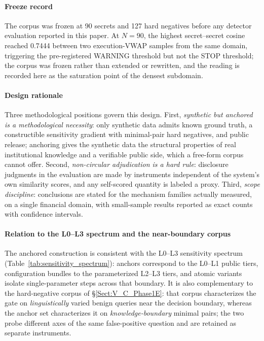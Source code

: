 \documentclass[journal]{IEEEtran}
\begin{document}
\paragraph{Freeze record}
The corpus was frozen at 90 secrets and 127 hard negatives before any
detector evaluation reported in this paper. At $N{=}90$, the highest
secret--secret cosine reached 0.7444 between two execution-VWAP samples from
the same domain, triggering the pre-registered WARNING threshold but not the
STOP threshold; the corpus was frozen rather than extended or rewritten, and
the reading is recorded here as the saturation point of the densest
subdomain.

\paragraph{Design rationale}
Three methodological positions govern this design. First, \emph{synthetic but
anchored is a methodological necessity}: only synthetic data admits known
ground truth, a constructible sensitivity gradient with minimal-pair hard
negatives, and public release; anchoring gives the synthetic data the
structural properties of real institutional knowledge and a verifiable public
side, which a free-form corpus cannot offer. Second, \emph{non-circular
adjudication is a hard rule}: disclosure judgments in the evaluation are made
by instruments independent of the system's own similarity scores, and any
self-scored quantity is labeled a proxy. Third, \emph{scope discipline}:
conclusions are stated for the mechanism families actually measured, on a
single financial domain, with small-sample results reported as exact counts
with confidence intervals.

\paragraph{Relation to the L0--L3 spectrum and the near-boundary corpus}
The anchored construction is consistent with the L0--L3 sensitivity spectrum
(Table~\ref{tab:sensitivity_spectrum}): anchors correspond to the L0--L1
public tiers, configuration bundles to the parameterized L2--L3 tiers, and
atomic variants isolate single-parameter steps across that boundary. It is
also complementary to the hard-negative corpus of \S\ref{Sect:V_C_Phase1E}:
that corpus characterizes the gate on \emph{linguistically} varied benign
queries near the decision boundary, whereas the anchor set characterizes it on
\emph{knowledge-boundary} minimal pairs; the two probe different axes of the
same false-positive question and are retained as separate instruments.
\end{document}
